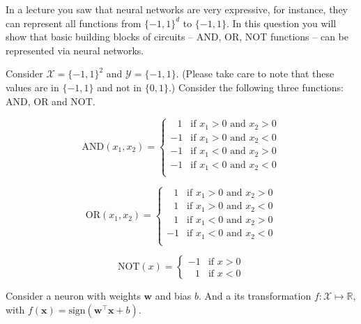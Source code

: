 In a lecture you saw that neural networks are very expressive, for instance, they can represent all functions from $\{-1,1\}^d$ to $\{-1,1\}$. In this question you will show that basic building blocks of circuits -- AND, OR, NOT functions -- can be represented via neural networks. 

\vspace{5mm}

Consider $\mathcal{X} = \{-1,1\}^2$ and $\mathcal{Y}= \{-1,1\}$. (Please take care to note that these values are in $\{-1,1\}$ and not in $\{0,1\}$.) 
Consider the following three functions: AND, OR and NOT.

\begin{equation}
\label{and_function}
\text{AND}(x_{1},x_{2}) 
= \begin{cases}
  \,\;\;1  & \text{if } x_{1} > 0 \text{ and } x_{2} > 0\\
  -1 & \text{if }  x_{1} > 0 \text{ and } x_{2} < 0\\
  -1 & \text{if }  x_{1} < 0 \text{ and } x_{2} > 0\\
  -1 & \text{if }  x_{1} < 0 \text{ and } x_{2} < 0\\
  \end{cases}  
\end{equation}

\begin{equation}
\label{or_function}
\text{OR}(x_{1},x_{2}) 
= \begin{cases}
  \,\;\;1  & \text{if } x_{1} > 0 \text{ and } x_{2} > 0\\
  \,\;\;1 & \text{if }  x_{1} > 0 \text{ and } x_{2} < 0\\
  \,\;\;1 & \text{if }  x_{1} < 0 \text{ and } x_{2} > 0\\
  -1 & \text{if }  x_{1} < 0 \text{ and } x_{2} < 0\\
  \end{cases}  
\end{equation}

\begin{equation}
\label{not_function}
\text{NOT}(x) 
= \begin{cases}
  -1  & \text{if } x > 0 \\
  \,\;\;1 & \text{if }  x< 0
  \end{cases}
\end{equation}

Consider a neuron with weights $\mathbf{w}$ and bias $b$. And a its transformation $f: \mathcal{X} \mapsto \mathbb{R}$, with $f(\mathbf{x})=\text{sign}(\mathbf{w}^{\intercal}\mathbf{x}+b)$.

